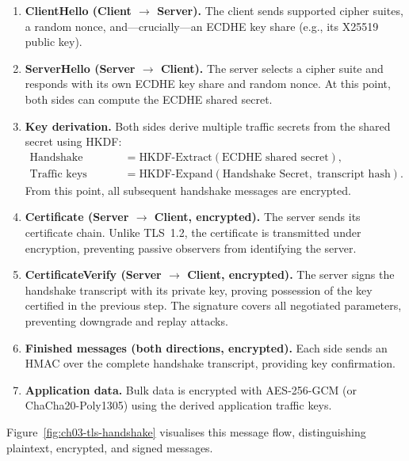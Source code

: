 \begin{enumerate}
\item \textbf{ClientHello (Client $\to$ Server).}  The client sends supported cipher suites, a random nonce, and---crucially---an ECDHE key share (e.g., its X25519 public key).

\item \textbf{ServerHello (Server $\to$ Client).}  The server selects a cipher suite and responds with its own ECDHE key share and random nonce.  At this point, both sides can compute the ECDHE shared secret.

\item \textbf{Key derivation.}  Both sides derive multiple traffic secrets from the shared secret using HKDF:
\begin{align}
\text{Handshake Secret} &= \text{HKDF-Extract}(\text{ECDHE shared secret}), \label{eq:hkdf1}\\
\text{Traffic keys} &= \text{HKDF-Expand}(\text{Handshake Secret},\;\text{transcript hash}). \label{eq:hkdf2}
\end{align}
From this point, all subsequent handshake messages are encrypted.

\item \textbf{Certificate (Server $\to$ Client, encrypted).}  The server sends its certificate chain.  Unlike TLS~1.2, the certificate is transmitted under encryption, preventing passive observers from identifying the server.

\item \textbf{CertificateVerify (Server $\to$ Client, encrypted).}  The server signs the handshake transcript with its private key, proving possession of the key certified in the previous step.  The signature covers all negotiated parameters, preventing downgrade and replay attacks.

\item \textbf{Finished messages (both directions, encrypted).}  Each side sends an HMAC over the complete handshake transcript, providing key confirmation.

\item \textbf{Application data.}  Bulk data is encrypted with AES-256-GCM (or ChaCha20-Poly1305) using the derived application traffic keys.
\end{enumerate}

Figure~\ref{fig:ch03-tls-handshake} visualises this message flow, distinguishing plaintext, encrypted, and signed messages.

